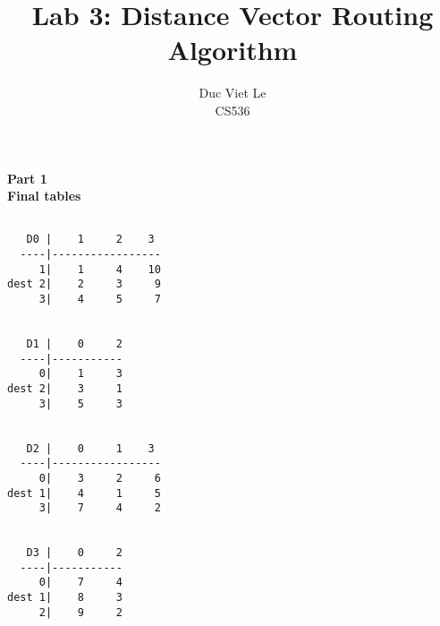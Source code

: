 \documentclass[12pt]{article}
\begin{document}
 
\title{Lab 3:  Distance Vector Routing Algorithm}
\author{Duc Viet Le\\ 
CS536}
\maketitle
\noindent
\large{\textbf{Part 1}}
\normalsize
\\
\textbf{Final tables}
\begin{Verbatim}

   D0 |    1     2    3 
  ----|-----------------
     1|    1     4    10
dest 2|    2     3     9
     3|    4     5     7


   D1 |    0     2 
  ----|-----------
     0|    1     3
dest 2|    3     1
     3|    5     3


   D2 |    0     1    3 
  ----|-----------------
     0|    3     2     6
dest 1|    4     1     5
     3|    7     4     2


   D3 |    0     2 
  ----|-----------
     0|    7     4
dest 1|    8     3
     2|    9     2
\end{Verbatim}
\end{document}
